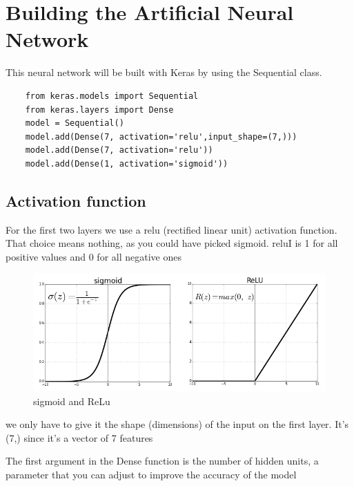 \section{Building the Artificial Neural Network}
\label{chap:approach}
This neural network will be built with Keras by using the Sequential class.

\begin{lstlisting}
    from keras.models import Sequential
    from keras.layers import Dense
    model = Sequential()
    model.add(Dense(7, activation='relu',input_shape=(7,)))
    model.add(Dense(7, activation='relu'))
    model.add(Dense(1, activation='sigmoid'))   
\end{lstlisting}
\subsection{Activation function}
\label{sec:Activation function}
    For the first two layers we use a relu (rectified linear unit) activation function.
     That choice means nothing, as you could have picked sigmoid.
    reluI is 1 for all positive values and 0 for all negative ones
  
    \begin{figure}[htp]
        \centering
        \includegraphics[width=1.1\textwidth]{images/sigmoid.png }
        \caption{sigmoid and ReLu }
        \label{fig:example4}
    \end{figure}
  
    we only have to give it the shape (dimensions) of the input on the first layer. 
    It’s (7,) since it’s a vector of 7 features
    \newpage

    The first argument in the Dense function is the number of hidden units, 
    a parameter that you can adjust to improve the accuracy of the model

